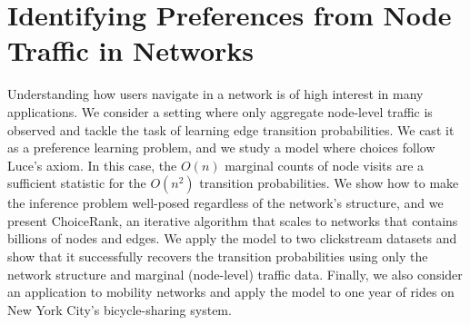 \chapter{Identifying Preferences from Node Traffic in Networks}

Understanding how users navigate in a network is of high interest in many applications.
We consider a setting where only aggregate node-level traffic is observed and tackle the task of learning edge transition probabilities.
We cast it as a preference learning problem, and we study a model where choices follow Luce's axiom.
In this case, the $O(n)$ marginal counts of node visits are a sufficient statistic for the $O(n^2)$ transition probabilities.
We show how to make the inference problem well-posed regardless of the network's structure, and we present ChoiceRank, an iterative algorithm that scales to networks that contains billions of nodes and edges.
We apply the model to two clickstream datasets and show that it successfully recovers the transition probabilities using only the network structure and marginal (node-level) traffic data.
Finally, we also consider an application to mobility networks and apply the model to one year of rides on New York City's bicycle-sharing system.













